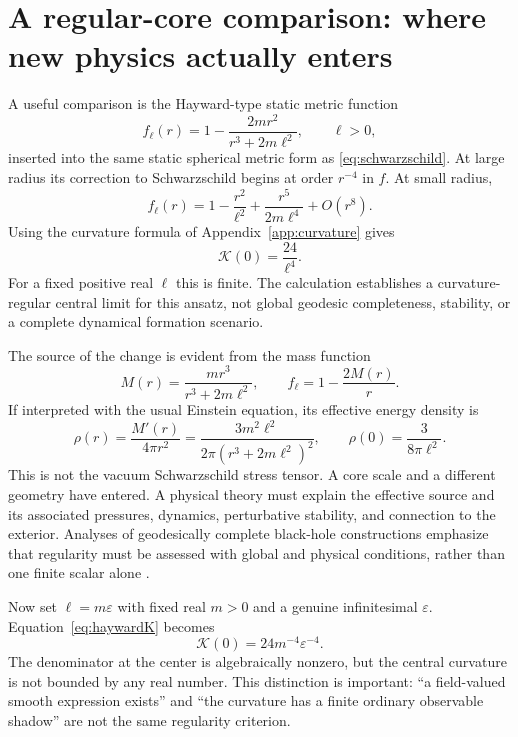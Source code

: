 \documentclass[11pt,a4paper]{article}
\numberwithin{equation}{section}
\theoremstyle{definition}
\theoremstyle{remark}
\newcommand{\eps}{\varepsilon}
\newcommand{\Krets}{\mathcal K}
\begin{document}
\section{A regular-core comparison: where new physics actually enters}
\label{sec:core}

A useful comparison is the Hayward-type static metric function \cite{Hayward}
\begin{equation}\label{eq:hayward}
 f_\ell(r)=1-\frac{2mr^2}{r^3+2m\ell^2},\qquad \ell>0,
\end{equation}
inserted into the same static spherical metric form as \eqref{eq:schwarzschild}. At large radius its correction to Schwarzschild begins at order $r^{-4}$ in $f$. At small radius,
\begin{equation}\label{eq:haywardexpansion}
 f_\ell(r)=1-\frac{r^2}{\ell^2}
 +\frac{r^5}{2m\ell^4}+O(r^8).
\end{equation}
Using the curvature formula of Appendix~\ref{app:curvature} gives
\begin{equation}\label{eq:haywardK}
 \Krets(0)=\frac{24}{\ell^4}.
\end{equation}
For a fixed positive real $\ell$ this is finite. The calculation establishes a curvature-regular central limit for this ansatz, not global geodesic completeness, stability, or a complete dynamical formation scenario.

The source of the change is evident from the mass function
\begin{equation}
 M(r)=\frac{mr^3}{r^3+2m\ell^2},\qquad f_\ell=1-\frac{2M(r)}r.
\end{equation}
If interpreted with the usual Einstein equation, its effective energy density is
\begin{equation}\label{eq:density}
 \rho(r)=\frac{M'(r)}{4\pi r^2}
 =\frac{3m^2\ell^2}{2\pi(r^3+2m\ell^2)^2},\qquad
 \rho(0)=\frac{3}{8\pi\ell^2}.
\end{equation}
This is not the vacuum Schwarzschild stress tensor. A core scale and a different geometry have entered. A physical theory must explain the effective source and its associated pressures, dynamics, perturbative stability, and connection to the exterior. Analyses of geodesically complete black-hole constructions emphasize that regularity must be assessed with global and physical conditions, rather than one finite scalar alone \cite{CompleteBH}.

Now set $\ell=m\eps$ with fixed real $m>0$ and a genuine infinitesimal $\eps$. Equation~\eqref{eq:haywardK} becomes
\begin{equation}
 \Krets(0)=24m^{-4}\eps^{-4}.
\end{equation}
The denominator at the center is algebraically nonzero, but the central curvature is not bounded by any real number. This distinction is important: ``a field-valued smooth expression exists'' and ``the curvature has a finite ordinary observable shadow'' are not the same regularity criterion.
\end{document}
